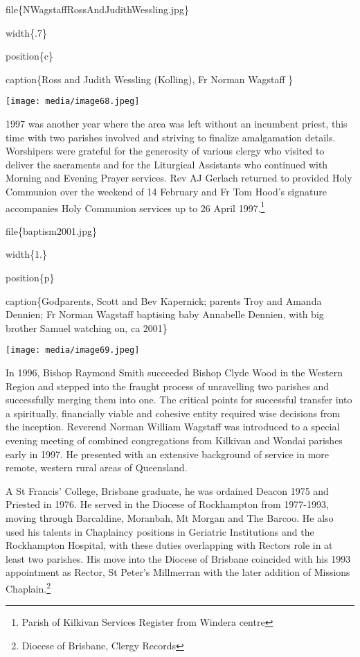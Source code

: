 file\{NWagstaffRossAndJudithWessling.jpg\}

width\{.7\}

position\{c\}

caption\{Ross and Judith Wessling (Kolling), Fr Norman Wagstaff \}

\texttt{[image: media/image68.jpeg]}

1997 was another year where the area was left without an incumbent priest, this time with two parishes involved and striving to finalize amalgamation details. Worshipers were grateful for the generosity of various clergy who visited to deliver the sacraments and for the Liturgical Assistants who continued with Morning and Evening Prayer services. Rev AJ Gerlach returned to provided Holy Communion over the weekend of 14 February and Fr Tom Hood's signature accompanies Holy Communion services up to 26 April 1997.\footnote{Parish of Kilkivan Services Register from Windera centre}

file\{baptism2001.jpg\}

width\{1.\}

position\{p\}

caption\{Godparents, Scott and Bev Kapernick; parents Troy and Amanda Dennien; Fr Norman Wagstaff baptising baby Annabelle Dennien, with big brother Samuel watching on, ca 2001\}

\texttt{[image: media/image69.jpeg]}

In 1996, Bishop Raymond Smith succeeded Bishop Clyde Wood in the Western Region and stepped into the fraught process of unravelling two parishes and successfully merging them into one. The critical points for successful transfer into a spiritually, financially viable and cohesive entity required wise decisions from the inception. Reverend Norman William Wagstaff was introduced to a special evening meeting of combined congregations from Kilkivan and Wondai parishes early in 1997. He presented with an extensive background of service in more remote, western rural areas of Queensland.

A St Francis' College, Brisbane graduate, he was ordained Deacon 1975 and Priested in 1976. He served in the Diocese of Rockhampton from 1977-1993, moving through Barcaldine, Moranbah, Mt Morgan and The Barcoo. He also used his talents in Chaplaincy positions in Geriatric Institutions and the Rockhampton Hospital, with these duties overlapping with Rectors role in at least two parishes. His move into the Diocese of Brisbane coincided with his 1993 appointment as Rector, St Peter's Millmerran with the later addition of Missions Chaplain.\footnote{Diocese of Brisbane, Clergy Records}

